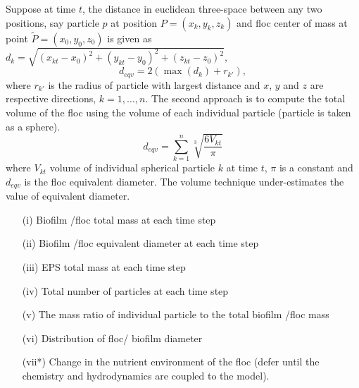 \documentclass[12pt,titlepage]{report}
\newcommand{\tP}{{\tilde {P}}}
\theoremstyle{definition}
\theoremstyle{remark}
\begin{document}
Suppose at time $t$, the distance in euclidean three-space between any two positions, say particle $p$ at position $P=(x_k,y_k,z_k)$ and floc center of mass at point $\tP=(x_0,y_0,z_0)$ is given as
 $d_{k}=\sqrt{(x_{kt}-x_0)^2+(y_{kt}-y_0)^2+(z_{kt}-z_0)^2}, $
\begin{equation}
d_{eqv}=2(\max{(d_{k})}+r_{k'}) ,
\end{equation}
where $r_{k'}$ is the radius of particle with largest distance and $x$, $y$ and $z$ are respective directions, $k=1,\ldots,n$. 
The second approach is to compute the total volume of the floc using the volume of each individual particle (particle is taken as a sphere).
\begin{equation}
d_{eqv}=\sum^n_{k=1} \sqrt[3]{\frac{6V_{kt}}{\pi}}
\end{equation}
where $V_{kt}$ volume of individual spherical particle $k$ at time $t$, $\pi$ is a constant and $d_{eqv}$ is the floc equivalent diameter. The volume technique under-estimates the value of equivalent diameter.


\begin{itemize}
\item[(i)] Biofilm /floc total mass at each time step
\item[(ii)] Biofilm /floc equivalent diameter at each time step
\item[(iii)] EPS total mass at each time step
\item[(iv)] Total number of particles at each time step
\item[(v)] The mass ratio of individual particle to the total biofilm /floc mass
\item[(vi)] Distribution of floc/ biofilm diameter
\item[(vii*)] Change in the nutrient environment of the floc (defer until the chemistry and hydrodynamics are coupled to the model).
\end{itemize}

\end{document}
